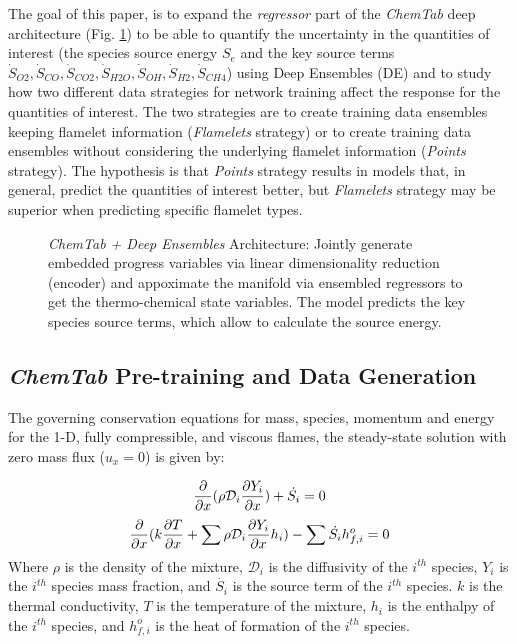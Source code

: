 \documentclass[conf]{new-aiaa}
\begin{document}
The goal of this paper, is to expand the \textit{regressor} part of the \textit{ChemTab} deep architecture (Fig.  \ref{fig:chemtab-to-chemtab-deep-ensembles}) to be able to quantify the uncertainty in the quantities of interest (the species source energy $S_e$ and the key source terms $\dot{S}_{O2}, \dot{S}_{CO}, \dot{S}_{CO2}, \dot{S}_{H2O}, \dot{S}_{OH}, \dot{S}_{H2}, \dot{S}_{CH4}$) using Deep Ensembles (DE) \cite{deepensembles} and to study how two different data strategies for network training affect the response for the quantities of interest. The two strategies are to create training data ensembles keeping flamelet information (\textit{Flamelets} strategy) or to create training data ensembles without considering the underlying flamelet information (\textit{Points} strategy). The hypothesis is that \textit{Points} strategy results in models that, in general, predict the quantities of interest better, but \textit{Flamelets} strategy may be superior when predicting specific flamelet types.
\begin{figure}
\begin{center}
  
  \caption{\textit{ChemTab + Deep Ensembles} Architecture: Jointly generate embedded progress variables via linear dimensionality reduction (encoder) and appoximate the manifold via ensembled regressors to get the thermo-chemical state variables. The model predicts the key species source terms, which allow to calculate the source energy.}
  \label{fig:chemtab-to-chemtab-deep-ensembles}
\end{center}
\end{figure}


\subsection{\textit{ChemTab} Pre-training and Data Generation}
The governing conservation equations for mass, species, momentum and energy for the 1-D, fully compressible, and viscous flames, the steady-state solution with zero mass flux ($u_x = 0$) is given by:

\begin{equation}
\label{sample:problemform}
\pdv{}{x}(\mathcal{\rho} \mathcal{D}_i \pdv{Y_i}{x}) + \dot{S_i} = 0
\end{equation}
\begin{equation}
\label{sample:problemform2}
\pdv{}{x}(k \pdv{T}{x} + \sum{\mathcal{\rho}  \mathcal{D}_i \pdv{Y_i}{x} h_i}) - \sum{\dot{S_i} h_{f,i}^o }= 0
\end{equation}
Where $\rho$ is the density of the mixture, $\mathcal{D}_i$ is the diffusivity of the $i^{th}$ species, $Y_i$ is the $i^{th}$ species mass fraction, and $\dot{S_i}$ is the source term of the $i^{th}$ species. $k$ is the thermal conductivity, $T$ is the temperature of the mixture, $h_i$ is the enthalpy of the $i^{th}$ species, and $h_{f,i}^o$ is the heat of formation of the $i^{th}$ species. 
\end{document}
